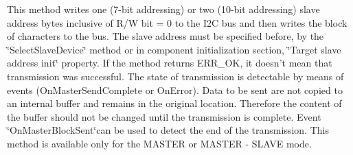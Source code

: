 This method writes one (7-\/bit addressing) or two (10-\/bit addressing) slave address bytes inclusive of R/\-W bit = 0 to the I2\-C bus and then writes the block of characters to the bus. The slave address must be specified before, by the \char`\"{}\-Select\-Slave\-Device\char`\"{} method or in component initialization section, \char`\"{}\-Target slave address init\char`\"{} property. If the method returns E\-R\-R\-\_\-\-O\-K, it doesn't mean that transmission was successful. The state of transmission is detectable by means of events (On\-Master\-Send\-Complete or On\-Error). Data to be sent are not copied to an internal buffer and remains in the original location. Therefore the content of the buffer should not be changed until the transmission is complete. Event \char`\"{}\-On\-Master\-Block\-Sent\char`\"{}can be used to detect the end of the transmission. This method is available only for the M\-A\-S\-T\-E\-R or M\-A\-S\-T\-E\-R -\/ S\-L\-A\-V\-E mode. 


